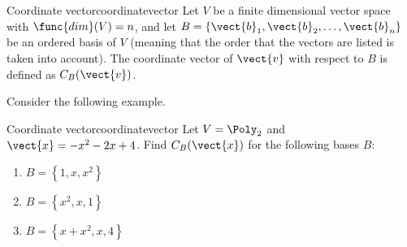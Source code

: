 \begin{definition}{Coordinate vector}{coordinatevector}
Let $V$ be a finite dimensional vector space with $\func{dim}(V)=n$, and
let $B=\{\vect{b}_1, \vect{b}_2, \ldots, \vect{b}_n\}$ be an ordered basis of $V$ (meaning that the order that the
vectors are listed is taken into account).
The coordinate vector of $\vect{v}$ with respect to $B$ is defined
as $C_B(\vect{v})$.
\end{definition}

Consider the following example.

\begin{example}{Coordinate vector}{coordinatevector}
Let $V = \Poly_2$ and $\vect{x} = -x^2 -2x + 4$. 
Find $C_B(\vect{x})$ for the following bases $B$:
\begin{enumerate}
\item $B = \left\{ 1, x, x^2 \right\}$
\item $B = \left\{ x^2, x, 1 \right\}$
\item $B = \left\{ x + x^2 , x , 4 \right\}$
\end{enumerate}
\end{example}

